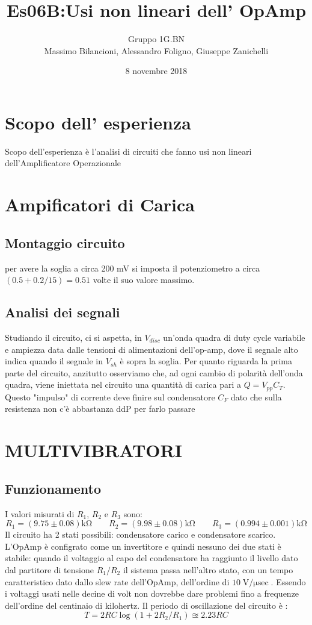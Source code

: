 \documentclass[10pt,a4paper]{article}
\author{Gruppo 1G.BN \\ Massimo Bilancioni, Alessandro Foligno, Giuseppe Zanichelli }
\title{Es06B:Usi non lineari dell’ OpAmp }
\begin{document}
	\date{8 novembre 2018}
	\maketitle
	
	
	\section*{Scopo dell' esperienza}
	Scopo dell'esperienza è l'analisi di circuiti che fanno usi non lineari dell'Amplificatore Operazionale




\section{Ampificatori di Carica}
	\subsection{Montaggio circuito}
		per avere la soglia a circa 200 \si{\milli \volt} si imposta il potenziometro a circa $(0.5+0.2/15)=0.51$ volte il suo valore massimo.
	\subsection{Analisi dei segnali}
		Studiando il circuito, ci si aspetta, in $V_{disc}$ un'onda quadra di duty cycle variabile e ampiezza data dalle tensioni di alimentazioni dell'op-amp, dove il segnale alto indica quando il segnale in $V_{sh}$ è sopra la soglia.
		Per quanto riguarda la prima parte del circuito, anzitutto osserviamo che, ad ogni cambio di polarità dell'onda quadra, viene iniettata nel circuito una quantità di carica pari a $Q=V_{pp} C_T$. Questo "impulso" di corrente deve finire sul condensatore $C_F$ dato che sulla resistenza non c'è abbastanza ddP per farlo passare
\section{ MULTIVIBRATORI }


\subsection{Funzionamento}
I valori misurati di $R_1$, $R_2$ e $R_3$ sono:
\[ R_1 = (9.75\pm 0.08)\si{\kilo\ohm} \qquad  R_2 = (9.98 \pm 0.08)\si{\kilo\ohm} \qquad   R_3 = ( 0.994 \pm0.001 ) \si{\kilo\ohm}\]
  Il circuito ha 2 stati possibili: condensatore carico e condensatore scarico. L'OpAmp è configrato come un invertitore e quindi nessuno dei due stati è stabile: quando il voltaggio al capo del condensatore ha raggiunto il livello dato dal partitore di tensione $R_1/R_2$ il sistema passa nell'altro stato, con un tempo caratteristico dato dallo slew rate dell'OpAmp, dell'ordine di $10 \si{\volt\per\micro\sec}$. Essendo i voltaggi usati nelle decine di volt non dovrebbe dare problemi fino a frequenze dell'ordine del centinaio di kilohertz.
Il periodo di oscillazione del circuito è : \[ T = 2 RC \log( 1+ 2 R_2/R_1) \approxeq 2.23 RC\]
\end{document}

